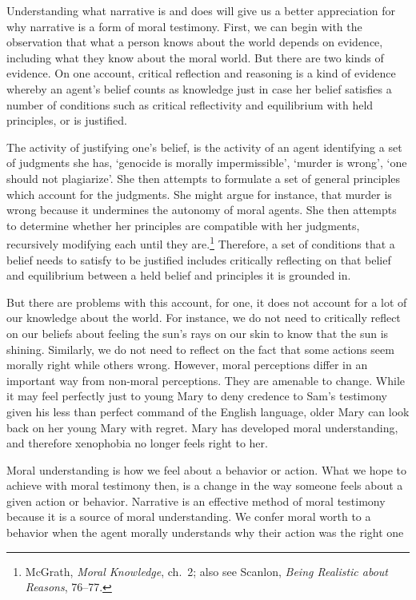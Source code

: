 \documentclass[
  12pt,
]{book}
\theoremstyle{definition}
\theoremstyle{definition}
\theoremstyle{definition}
\theoremstyle{definition}
\theoremstyle{remark}
\begin{document}
Understanding what narrative is and does will give us a better appreciation for why narrative is a form of moral testimony. First, we can begin with the observation that what a person knows about the world depends on evidence, including what they know about the moral world. But there are two kinds of evidence. On one account, critical reflection and reasoning is a kind of evidence whereby an agent's belief counts as knowledge just in case her belief satisfies a number of conditions such as critical reflectivity and equilibrium with held principles, or is justified.

The activity of justifying one's belief, is the activity of an agent identifying a set of judgments she has, `genocide is morally impermissible', `murder is wrong', `one should not plagiarize'. She then attempts to formulate a set of general principles which account for the judgments. She might argue for instance, that murder is wrong because it undermines the autonomy of moral agents. She then attempts to determine whether her principles are compatible with her judgments, recursively modifying each until they are.\footnote{McGrath, \emph{Moral {Knowledge}}, ch.~2; also see Scanlon, \emph{Being Realistic about Reasons}, 76--77.} Therefore, a set of conditions that a belief needs to satisfy to be justified includes critically reflecting on that belief and equilibrium between a held belief and principles it is grounded in.

But there are problems with this account, for one, it does not account for a lot of our knowledge about the world. For instance, we do not need to critically reflect on our beliefs about feeling the sun's rays on our skin to know that the sun is shining. Similarly, we do not need to reflect on the fact that some actions seem morally right while others wrong. However, moral perceptions differ in an important way from non-moral perceptions. They are amenable to change. While it may feel perfectly just to young Mary to deny credence to Sam's testimony given his less than perfect command of the English language, older Mary can look back on her young Mary with regret. Mary has developed moral understanding, and therefore xenophobia no longer feels right to her.

Moral understanding is how we feel about a behavior or action. What we hope to achieve with moral testimony then, is a change in the way someone feels about a given action or behavior. Narrative is an effective method of moral testimony because it is a source of moral understanding. We confer moral worth to a behavior when the agent morally understands why their action was the right one
\end{document}
